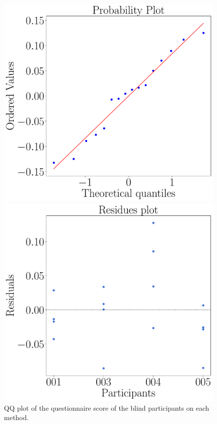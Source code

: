 \begin{figure}[!thb]
    \centering
    \begin{minipage}{0.45\textwidth}
        \centering
        \includegraphics[width = \textwidth]{Resultados/Questionario/Figuras/pdf/qqplot_questionnaires_blind.pdf}
        \caption{QQ plot of the questionnaire score of the blind participants on each method.}
        \label{fig:qqplot_questionnaires_blind}
    \end{minipage}
    \begin{minipage}{0.075\textwidth}
        \hfill
    \end{minipage}
    \begin{minipage}{0.45\textwidth}
        \centering
        \includegraphics[width = \textwidth]{Resultados/Questionario/Figuras/pdf/residplot_questionnaires_blind.pdf}

\end{minipage}
\end{figure}
